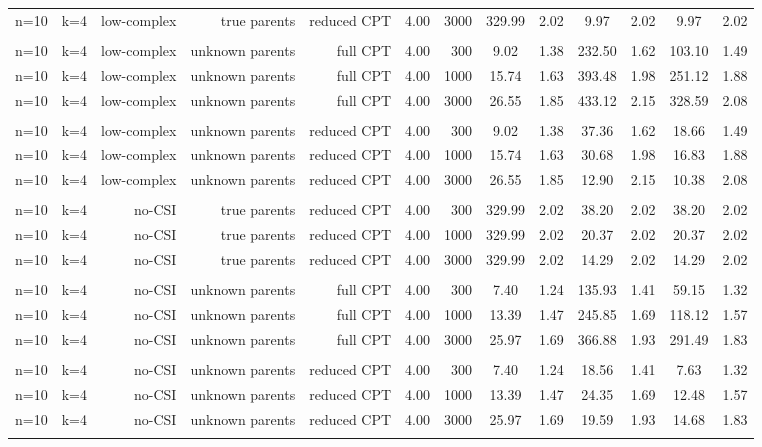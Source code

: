 \begin{table}[ht]
\begin{tabular}{rrrrrrr|cc|cc|cc}
  n=10 & k=4 & low-complex & true parents & reduced CPT & 4.00 & 3000 & 329.99 & 2.02 & 9.97 & 2.02 & 9.97 & 2.02 \\ 
   \\ 
n=10 & k=4 & low-complex & unknown parents & full CPT & 4.00 & 300 & 9.02 & 1.38 & 232.50 & 1.62 & 103.10 & 1.49 \\ 
  n=10 & k=4 & low-complex & unknown parents & full CPT & 4.00 & 1000 & 15.74 & 1.63 & 393.48 & 1.98 & 251.12 & 1.88 \\ 
  n=10 & k=4 & low-complex & unknown parents & full CPT & 4.00 & 3000 & 26.55 & 1.85 & 433.12 & 2.15 & 328.59 & 2.08 \\ 
   \\ 
n=10 & k=4 & low-complex & unknown parents & reduced CPT & 4.00 & 300 & 9.02 & 1.38 & 37.36 & 1.62 & 18.66 & 1.49 \\ 
  n=10 & k=4 & low-complex & unknown parents & reduced CPT & 4.00 & 1000 & 15.74 & 1.63 & 30.68 & 1.98 & 16.83 & 1.88 \\ 
  n=10 & k=4 & low-complex & unknown parents & reduced CPT & 4.00 & 3000 & 26.55 & 1.85 & 12.90 & 2.15 & 10.38 & 2.08 \\ 
   \\ 
n=10 & k=4 & no-CSI & true parents & reduced CPT & 4.00 & 300 & 329.99 & 2.02 & 38.20 & 2.02 & 38.20 & 2.02 \\ 
  n=10 & k=4 & no-CSI & true parents & reduced CPT & 4.00 & 1000 & 329.99 & 2.02 & 20.37 & 2.02 & 20.37 & 2.02 \\ 
  n=10 & k=4 & no-CSI & true parents & reduced CPT & 4.00 & 3000 & 329.99 & 2.02 & 14.29 & 2.02 & 14.29 & 2.02 \\ 
   \\ 
n=10 & k=4 & no-CSI & unknown parents & full CPT & 4.00 & 300 & 7.40 & 1.24 & 135.93 & 1.41 & 59.15 & 1.32 \\ 
  n=10 & k=4 & no-CSI & unknown parents & full CPT & 4.00 & 1000 & 13.39 & 1.47 & 245.85 & 1.69 & 118.12 & 1.57 \\ 
  n=10 & k=4 & no-CSI & unknown parents & full CPT & 4.00 & 3000 & 25.97 & 1.69 & 366.88 & 1.93 & 291.49 & 1.83 \\ 
   \\ 
n=10 & k=4 & no-CSI & unknown parents & reduced CPT & 4.00 & 300 & 7.40 & 1.24 & 18.56 & 1.41 & 7.63 & 1.32 \\ 
  n=10 & k=4 & no-CSI & unknown parents & reduced CPT & 4.00 & 1000 & 13.39 & 1.47 & 24.35 & 1.69 & 12.48 & 1.57 \\ 
  n=10 & k=4 & no-CSI & unknown parents & reduced CPT & 4.00 & 3000 & 25.97 & 1.69 & 19.59 & 1.93 & 14.68 & 1.83 \\ 
   \bottomrule 
 \multicolumn{13}{l}{\scriptsize } 
 \end{tabular}
\end{table}
